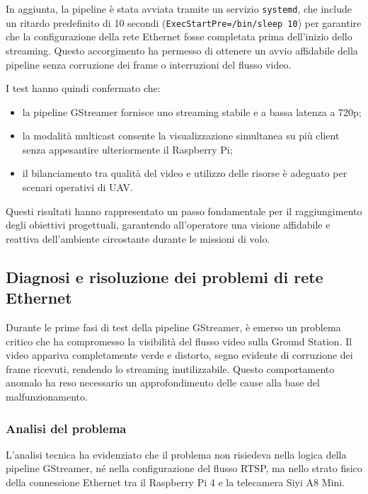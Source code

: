 In aggiunta, la pipeline è stata avviata tramite un servizio \texttt{systemd}, che include un ritardo predefinito di 10 secondi (\texttt{ExecStartPre=/bin/sleep 10}) per garantire che la configurazione della rete Ethernet fosse completata prima dell’inizio dello streaming. Questo accorgimento ha permesso di ottenere un avvio affidabile della pipeline senza corruzione dei frame o interruzioni del flusso video.

I test hanno quindi confermato che:
\begin{itemize}
    \item la pipeline GStreamer fornisce uno streaming stabile e a bassa latenza a 720p;
    \item la modalità multicast consente la visualizzazione simultanea su più client senza appesantire ulteriormente il Raspberry Pi;
    \item il bilanciamento tra qualità del video e utilizzo delle risorse è adeguato per scenari operativi di UAV.
\end{itemize}

Questi risultati hanno rappresentato un passo fondamentale per il raggiungimento degli obiettivi progettuali, garantendo all’operatore una visione affidabile e reattiva dell’ambiente circostante durante le missioni di volo.

\subsection{Diagnosi e risoluzione dei problemi di rete Ethernet}

Durante le prime fasi di test della pipeline GStreamer, è emerso un problema critico che ha compromesso la visibilità del flusso video sulla Ground Station.  
Il video appariva completamente verde e distorto, segno evidente di corruzione dei frame ricevuti, rendendo lo streaming inutilizzabile.  
Questo comportamento anomalo ha reso necessario un approfondimento delle cause alla base del malfunzionamento.

\subsubsection{Analisi del problema}

L’analisi tecnica \cite{forum_siyi} ha evidenziato che il problema non risiedeva nella logica della pipeline GStreamer, né nella configurazione del flusso RTSP, ma nello strato fisico della connessione Ethernet tra il Raspberry Pi 4 e la telecamera Siyi A8 Mini.  


